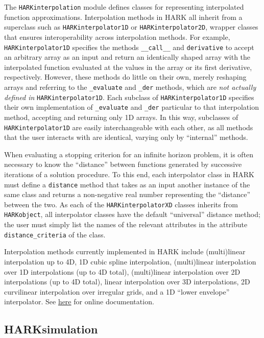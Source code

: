 \documentclass[12pt,titlepage,letterpaper]{econtex}
\begin{document}
The \texttt{HARKinterpolation} module defines classes for representing interpolated function approximations.  Interpolation methods in HARK all inherit from a superclass such as \texttt{HARKinterpolator1D} or \texttt{HARKinterpolator2D}, wrapper classes that ensures interoperability across interpolation methods.  For example, \texttt{HARKinterpolator1D} specifies the methods \texttt{\_\_call\_\_} and \texttt{derivative} to accept an arbitrary array as an input and return an identically shaped array with the interpolated function evaluated at the values in the array or its first derivative, respectively.  However, these methods do little on their own, merely reshaping arrays and referring to the \texttt{\_evaluate} and \texttt{\_der} methods, which are \textit{not actually defined in} \texttt{HARKinterpolator1D}.  Each subclass of \texttt{HARKinterpolator1D} specifies their own implementation of \texttt{\_evaluate} and \texttt{\_der} particular to that interpolation method, accepting and returning only 1D arrays.  In this way, subclasses of \texttt{HARKinterpolator1D} are easily interchangeable with each other, as all methods that the user interacts with are identical, varying only by ``internal'' methods.

When evaluating a stopping criterion for an infinite horizon problem, it is often necessary to know the ``distance'' between functions generated by successive iterations of a solution procedure.  To this end, each interpolator class in HARK must define a \texttt{distance} method that takes as an input another instance of the same class and returns a non-negative real number representing the ``distance'' between the two.  As each of the \texttt{HARKinterpolatorXD} classes inherits from \texttt{HARKobject}, all interpolator classes have the default ``universal'' distance method; the user must simply list the names of the relevant attributes in the attribute \texttt{distance\_criteria} of the class.

Interpolation methods currently implemented in HARK include (multi)linear interpolation up to 4D, 1D cubic spline interpolation, (multi)linear interpolation over 1D interpolations (up to 4D total), (multi)linear interpolation over 2D interpolations (up to 4D total), linear interpolation over 3D interpolations, 2D curvilinear interpolation over irregular grids, and a 1D ``lower envelope'' interpolator.  See \href{https://econ-ark.github.io/HARK/generated/HARKinterpolation.html}{here} for online documentation.

\subsection{HARKsimulation}\label{sec:HARKsimulation}
\end{document}
